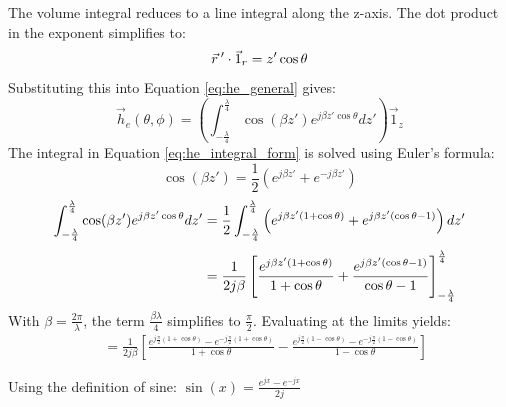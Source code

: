 The volume integral reduces to a line integral along the z-axis. The dot product in the exponent simplifies to:
\begin{equation}
	\vec{r}\hspace{0.2em}' \cdot \vec{1}_r = z' \cos\theta
\end{equation}
\vspace{0.5em}
Substituting this into Equation \ref{eq:he_general} gives:
\begin{equation}
	\vec{h}_e(\theta, \phi) = \left( \int_{-\frac{\lambda}{4}}^{\frac{\lambda}{4}} \cos(\beta z') e^{j\beta z' \cos\theta} dz' \right) \vec{1}_z
	\label{eq:he_integral_form}
\end{equation}
\vspace{0.5em}
The integral in Equation \ref{eq:he_integral_form} is solved using Euler's formula:
\begin{equation}
	\cos(\beta z') = \frac{1}{2}(e^{j\beta z'} + e^{-j\beta z'})
\end{equation}
\begin{align}
	\int_{-\frac{\lambda}{4}}^{\frac{\lambda}{4}} \cos(\beta z') e^{j\beta z' \cos\theta} dz' &= \frac{1}{2} \int_{-\frac{\lambda}{4}}^{\frac{\lambda}{4}} \left( e^{j\beta z'(1+\cos\theta)} + e^{j\beta z'(\cos\theta-1)} \right) dz' \\[\jot]
	&= \frac{1}{2j\beta} \left[ \frac{e^{j\beta z'(1+\cos\theta)}}{1+\cos\theta} + \frac{e^{j\beta z'(\cos\theta-1)}}{\cos\theta-1} \right]_{-\frac{\lambda}{4}}^{\frac{\lambda}{4}}
\end{align}
\vspace{1em}
With $\beta = \frac{2\pi}{\lambda}$, the term $\frac{\beta\lambda}{4}$ simplifies to $\frac{\pi}{2}$. Evaluating at the limits yields:
\vspace{1em}
\begin{align}
	&= \frac{1}{2j\beta} \left[ \frac{e^{j\frac{\pi}{2}(1+\cos\theta)} - e^{-j\frac{\pi}{2}(1+\cos\theta)}}{1+\cos\theta} - \frac{e^{j\frac{\pi}{2}(1-\cos\theta)} - e^{-j\frac{\pi}{2}(1-\cos\theta)}}{1-\cos\theta} \right]
\end{align}

\vspace{1em}
Using the definition of sine: $\sin(x) = \frac{e^{jx}-e^{-jx}}{2j}$

